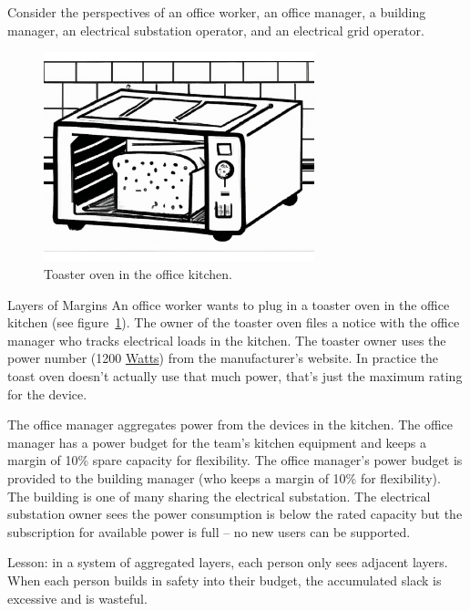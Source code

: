 Consider the perspectives of an office worker, an office manager, a building manager, an electrical substation operator, and an electrical grid operator.
\begin{center}
\begin{figure}
    \centering
    \includegraphics[width=0.7\textwidth]{images/toaster_oven_in_office_kitchen.pdf}
    \caption{Toaster oven in the office kitchen.}
    \label{fig:toaster_oven}
\end{figure}
\end{center}

\begin{storytime}{Layers of Margins}
An office worker wants to plug in a toaster oven in the office kitchen (see figure~\ref{fig:toaster_oven}). The owner of the toaster oven files a notice with the office manager who tracks electrical loads in the kitchen. 
The toaster owner uses the power number (1200 \href{https://en.wikipedia.org/wiki/Watt}{Watts}) 
from the manufacturer's website. In practice the toast oven doesn't actually use that much power, that's just the maximum rating for the device. 

The office manager aggregates power from the devices in the kitchen. The office manager has a power budget for the team's kitchen equipment and keeps a margin of 10\% spare capacity for flexibility. The office manager's power budget is provided to the building manager (who keeps a margin of 10\% for flexibility). The building is one of many sharing the electrical substation. The electrical substation owner sees the power consumption is below the rated capacity but the subscription for available power is full -- no new users can be supported.
\end{storytime}
Lesson: in a system of aggregated layers, each person only sees adjacent layers. When each person builds in safety into their budget, the accumulated slack is excessive and is wasteful.

